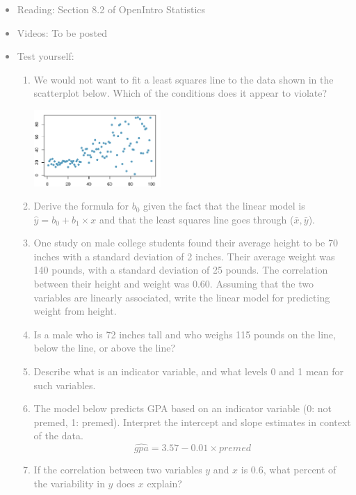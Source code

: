 \documentclass[11pt]{article}
\newcommand{\gray}[1]{\textcolor{gray}{#1}}
\begin{document}
\gray{
{\it
\vspace{-0.55cm}
\begin{itemize}
\renewcommand{\labelitemi}{{\textcolor{dark}{$\ast$}}}
\item Reading: Section 8.2 of OpenIntro Statistics
\item Videos: To be posted
\item Test yourself:
\begin{enumerate}
\item We would not want to fit a least squares line to the data shown in the scatterplot below. Which of the conditions does it appear to violate?
\begin{center}
\includegraphics[width=0.4\textwidth]{figures/nonconstant_var}
\end{center}
\item Derive the formula for $b_0$ given the fact that the linear model is $\hat{y} = b_0 + b_1 \times x$ and that the least squares line goes through ($\bar{x}, \bar{y}$).
\item One study on male college students found their average height to be 70 inches with a standard deviation of 2 inches. Their average weight was 140 pounds, with a standard deviation of 25 pounds. The correlation between their height and weight was 0.60. Assuming that the two variables are linearly associated, write the linear model for predicting weight from height.
\item Is a male who is 72 inches tall and who weighs 115 pounds on the line, below the line, or above the line?
\item Describe what is an indicator variable, and what levels 0 and 1 mean for such variables.
\item The model below predicts GPA based on an indicator variable (0: not premed, 1: premed). Interpret the intercept and slope estimates in context of the data.
\[ \widehat{gpa} = 3.57 - 0.01 \times premed \]
\item If the correlation between two variables $y$ and $x$ is 0.6, what percent of the variability in $y$ does $x$ explain? 
\end{enumerate}
\end{itemize}
}}
\end{document}
